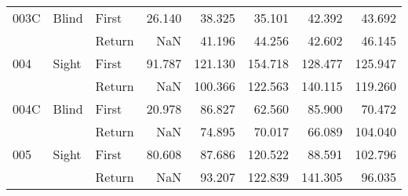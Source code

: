 \begin{table}[!htb]
\begin{tabular}{lllrrrrr}
003C & Blind & First &    26.140 &  38.325 &                                                 35.101 &                                                  42.392 &   43.692 \\
    &       & Return &       NaN &  41.196 &                                                 44.256 &                                                  42.602 &   46.145 \\
004 & Sight & First &    91.787 & 121.130 &                                                154.718 &                                                 128.477 &  125.947 \\
    &       & Return &       NaN & 100.366 &                                                122.563 &                                                 140.115 &  119.260 \\
004C & Blind & First &    20.978 &  86.827 &                                                 62.560 &                                                  85.900 &   70.472 \\
    &       & Return &       NaN &  74.895 &                                                 70.017 &                                                  66.089 &  104.040 \\
005 & Sight & First &    80.608 &  87.686 &                                                120.522 &                                                  88.591 &  102.796 \\
    &       & Return &       NaN &  93.207 &                                                122.839 &                                                 141.305 &   96.035 \\
\bottomrule
\end{tabular}
\end{table}

